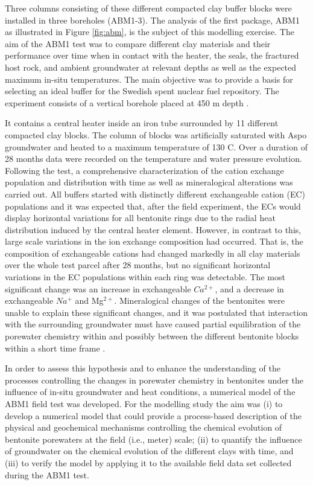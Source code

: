 Three columns consisting of these different compacted clay buffer blocks
were installed in three boreholes (ABM1-3). The analysis of the first
package, ABM1 as illustrated in Figure \ref{fig:abm}, 
is the subject of this modelling exercise. 
The aim of the ABM1 test was to compare different clay materials 
and their performance over time when in contact with 
the heater, the seals, the fractured
host rock, and ambient groundwater at relevant depths as well as
the expected maximum in-situ temperatures. 
The main objective was to provide a basis for selecting an ideal 
buffer for the Swedish spent nuclear fuel repository. 
The experiment consists of a vertical borehole placed at
450 m depth \citep{svensson_2011}. 

It contains a central heater inside an iron tube surrounded by 11
different compacted clay blocks. The column of blocks was artificially
saturated with Aspo groundwater and heated to a maximum
temperature of 130 C. Over a duration of 28 months data were
recorded on the temperature and water pressure evolution.
Following the test, a comprehensive characterization of the cation
exchange population and distribution with time \citep{dohrmann_2013}
as well as mineralogical alterations \citep{kaufhold_2013} 
was carried out. All buffers started with distinctly different
exchangeable cation (EC) populations and it was expected that,
after the field experiment, the ECs would display horizontal variations
for all bentonite rings due to the radial heat distribution
induced by the central heater element. However, in contrast to this,
large scale variations in the ion exchange composition had
occurred. That is, the composition of exchangeable cations had
changed markedly in all clay materials over the whole test parcel
after 28 months, but no significant horizontal variations in the EC
populations within each ring was detectable. The most significant
change was an increase in exchangeable $Ca^{2+}$, and a decrease in
exchangeable $Na^{+}$ and Mg$^{2+}$. 
Mineralogical changes of the bentonites
were unable to explain these significant changes, and it was
postulated that interaction with the surrounding groundwater
must have caused partial equilibration of the porewater chemistry
within and possibly between the different bentonite blocks within
a short time frame \citep{dohrmann_2013}. 

In order to assess this hypothesis and to enhance the understanding
of the processes controlling the changes in porewater chemistry 
in bentonites under the influence of in-situ groundwater 
and heat conditions, a numerical model of the ABM1 
field test was developed.
For the modelling study the aim was (i) to develop a numerical model that
could provide a process-based description of the physical and
geochemical mechanisms controlling the chemical evolution of
bentonite porewaters at the field (i.e., meter) scale; 
(ii) to quantify the influence of groundwater on the chemical evolution of the
different clays with time, and (iii) to verify the model by applying it
to the available field data set collected during the ABM1 test.

